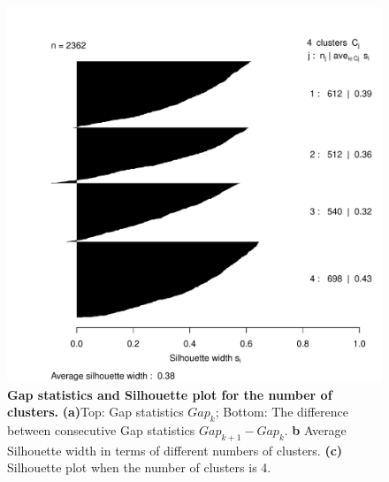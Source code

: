 \begin{figure}
\begin{minipage}[t]{0.33\textwidth}
    \subcaption{}
  \end{minipage}
  \begin{minipage}[t]{0.34\textwidth}
    \includegraphics[width=1\textwidth, height =0.8\textwidth]{fig/sil_PCA_4.pdf}
    \subcaption{}
  \end{minipage}
  \caption{\textbf{Gap statistics and Silhouette plot for the number of clusters.} \textbf{(a)}Top: Gap statistics $Gap_k$; Bottom: The difference between consecutive Gap statistics $Gap_{k+1}-Gap_{k}$. \textbf{b} Average Silhouette width in terms of different numbers of clusters. \textbf{(c)} Silhouette plot when the number of clusters is 4.}
  \label{fig:Gap and Sil}
\end{figure}


